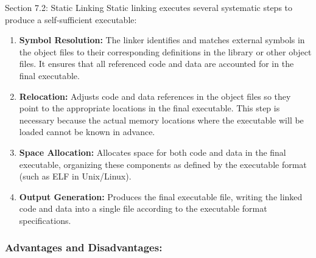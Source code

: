 \begin{notes}{Section 7.2: Static Linking}
    Static linking executes several systematic steps to produce a self-sufficient executable:
    \begin{enumerate}
        \item \textbf{Symbol Resolution:} The linker identifies and matches external symbols in the object files to their corresponding definitions in the library or other object files. It ensures 
        that all referenced code and data are accounted for in the final executable.
        \item \textbf{Relocation:} Adjusts code and data references in the object files so they point to the appropriate locations in the final executable. This step is necessary because the actual 
        memory locations where the executable will be loaded cannot be known in advance.
        \item \textbf{Space Allocation:} Allocates space for both code and data in the final executable, organizing these components as defined by the executable format (such as ELF in Unix/Linux).
        \item \textbf{Output Generation:} Produces the final executable file, writing the linked code and data into a single file according to the executable format specifications.
    \end{enumerate}
    
    \subsubsection*{Advantages and Disadvantages:}
    

\end{notes}
